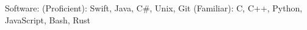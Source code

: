 



Software: (Proficient): Swift, Java, C\#, Unix, Git (Familiar): C, C++, Python, JavaScript, Bash, Rust






